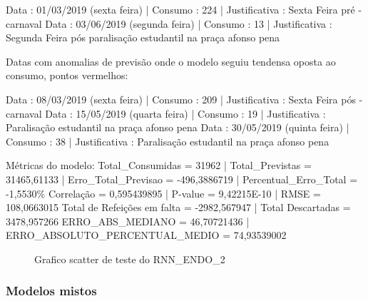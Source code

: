 \documentclass[	12pt, Times, openright, twoside, a4paper, english, brazil]{abntex2}
\begin{document}
            \hline Data : 01/03/2019 (sexta feira)    | Consumo : 224 | Justificativa : Sexta Feira pré - carnaval
            \hline Data : 03/06/2019 (segunda feira)  | Consumo : 13  | Justificativa : Segunda Feira pós paralisação estudantil na praça afonso pena

            Datas com anomalias de previsão onde o modelo seguiu tendensa oposta ao consumo, pontos vermelhos:

            \hline Data : 08/03/2019 (sexta feira)    | Consumo : 209 | Justificativa : Sexta Feira pós - carnaval
            \hline Data : 15/05/2019 (quarta feira)   | Consumo : 19  | Justificativa : Paralisação estudantil na praça afonso pena
            \hline Data : 30/05/2019 (quinta feira)   | Consumo : 38  | Justificativa : Paralisação estudantil na praça afonso pena

            Métricas do modelo:
            \hline Total\_Consumidas = 31962 | Total\_Previstas = 31465,61133 | Erro\_Total\_Previsao = -496,3886719 | Percentual\_Erro\_Total = -1,5530\%
            \hline Correlação = 0,595439895 | P-value = 9,42215E-10         | RMSE = 108,0663015
            \hline Total de Refeições em falta = -2982,567947 | Total Descartadas = 3478,957266
            \hline ERRO\_ABS\_MEDIANO = 46,70721436 | ERRO\_ABSOLUTO\_PERCENTUAL\_MEDIO = 74,93539002
            \begin{figure}[!ht]
              \caption{Grafico scatter de teste do RNN\_ENDO\_2 \label{fig:case1_rnn_endo2_test_scatter} }
            \end{figure}
    	    \subsubsection{Modelos mistos}
\end{document}
